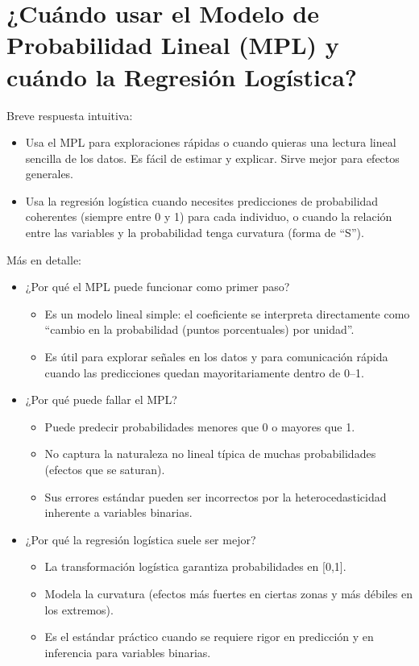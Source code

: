 \documentclass[
  spanish,
  letterpaper,
  DIV=11,
  numbers=noendperiod]{scrreprt}
\providecommand{\tightlist}{%
  \setlength{\itemsep}{0pt}\setlength{\parskip}{0pt}}
\begin{document}
\section{¿Cuándo usar el Modelo de Probabilidad Lineal (MPL) y cuándo la
Regresión
Logística?}\label{cuuxe1ndo-usar-el-modelo-de-probabilidad-lineal-mpl-y-cuuxe1ndo-la-regresiuxf3n-loguxedstica}

Breve respuesta intuitiva:

\begin{itemize}
\tightlist
\item
  Usa el MPL para exploraciones rápidas o cuando quieras una lectura
  lineal sencilla de los datos. Es fácil de estimar y explicar. Sirve
  mejor para efectos generales.
\item
  Usa la regresión logística cuando necesites predicciones de
  probabilidad coherentes (siempre entre 0 y 1) para cada individuo, o
  cuando la relación entre las variables y la probabilidad tenga
  curvatura (forma de ``S'').
\end{itemize}

Más en detalle:

\begin{itemize}
\tightlist
\item
  ¿Por qué el MPL puede funcionar como primer paso?

  \begin{itemize}
  \tightlist
  \item
    Es un modelo lineal simple: el coeficiente se interpreta
    directamente como ``cambio en la probabilidad (puntos porcentuales)
    por unidad''.
  \item
    Es útil para explorar señales en los datos y para comunicación
    rápida cuando las predicciones quedan mayoritariamente dentro de
    0--1.
  \end{itemize}
\item
  ¿Por qué puede fallar el MPL?

  \begin{itemize}
  \tightlist
  \item
    Puede predecir probabilidades menores que 0 o mayores que 1.
  \item
    No captura la naturaleza no lineal típica de muchas probabilidades
    (efectos que se saturan).
  \item
    Sus errores estándar pueden ser incorrectos por la
    heterocedasticidad inherente a variables binarias.
  \end{itemize}
\item
  ¿Por qué la regresión logística suele ser mejor?

  \begin{itemize}
  \tightlist
  \item
    La transformación logística garantiza probabilidades en {[}0,1{]}.
  \item
    Modela la curvatura (efectos más fuertes en ciertas zonas y más
    débiles en los extremos).
  \item
    Es el estándar práctico cuando se requiere rigor en predicción y en
    inferencia para variables binarias.
  \end{itemize}
\end{itemize}
\end{document}
